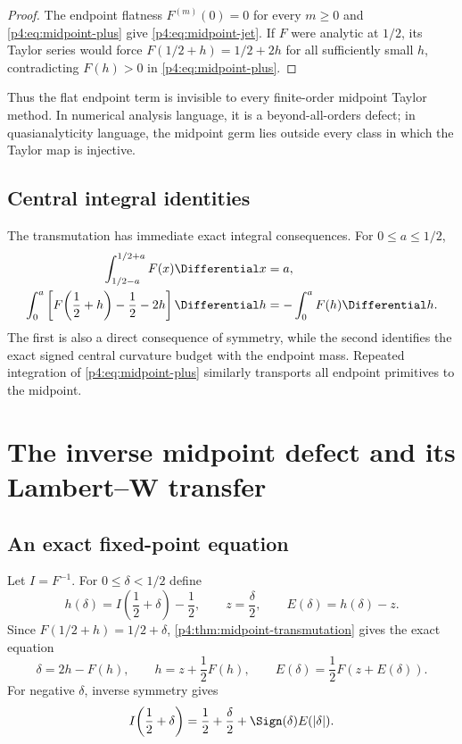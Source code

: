 \documentclass[11pt]{article}
\numberwithin{equation}{section}
\theoremstyle{definition}
\theoremstyle{remark}
\begin{document}
\begin{proof}
The endpoint flatness $F^{(m)}(0)=0$ for every $m\ge0$ and \eqref{p4:eq:midpoint-plus} give \eqref{p4:eq:midpoint-jet}.  If $F$ were analytic at $1/2$, its Taylor series would force
$F(1/2+h)=1/2+2h$ for all sufficiently small $h$, contradicting $F(h)>0$ in \eqref{p4:eq:midpoint-plus}.
\end{proof}

Thus the flat endpoint term is invisible to every finite-order midpoint Taylor method.  In numerical analysis language, it is a beyond-all-orders defect; in quasianalyticity language, the midpoint germ lies outside every class in which the Taylor map is injective.

\subsection{Central integral identities}
The transmutation has immediate exact integral consequences.  For $0\le a\le1/2$,
\begin{align}
 \int_{1/2-a}^{1/2+a}F(x)\Differential x&=a,
 \label{p4:eq:central-mass}\\
 \int_0^a\left[F\!\left(\frac12+h\right)-\frac12-2h\right]\Differential h
 &=-\int_0^aF(h)\Differential h.
 \label{p4:eq:central-defect-integral}
\end{align}
The first is also a direct consequence of symmetry, while the second identifies the exact signed central curvature budget with the endpoint mass.  Repeated integration of \eqref{p4:eq:midpoint-plus} similarly transports all endpoint primitives to the midpoint.

\section{The inverse midpoint defect and its Lambert--W transfer}
\label{p4:sec:inverse-midpoint}

\subsection{An exact fixed-point equation}
Let $I=F^{-1}$.  For $0\le\delta<1/2$ define
\begin{equation}
 h(\delta)=I\!\left(\frac12+\delta\right)-\frac12,
 \qquad z=\frac\delta2,
 \qquad E(\delta)=h(\delta)-z.
 \label{p4:eq:inverse-definitions}
\end{equation}
Since $F(1/2+h)=1/2+\delta$, \cref{p4:thm:midpoint-transmutation} gives the exact equation
\begin{equation}
 \delta=2h-F(h),
 \qquad
 h=z+\frac12F(h),
 \qquad
 E(\delta)=\frac12F(z+E(\delta)).
 \label{p4:eq:inverse-fixed-point}
\end{equation}
For negative $\delta$, inverse symmetry gives
\begin{equation}
 I\!\left(\frac12+\delta\right)
 =\frac12+\frac\delta2+\Sign(\delta)E(|\delta|).
 \label{p4:eq:inverse-odd-defect}
\end{equation}
\end{document}
